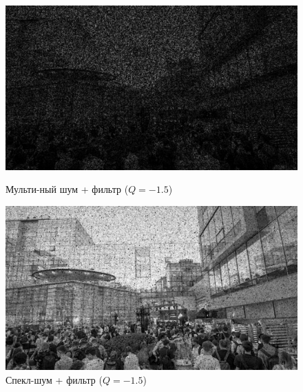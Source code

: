 \documentclass[a4paper]{article}
\begin{document}
\begin{figure}[H]
    \begin{minipage}{0.49\textwidth}
        \centering \includegraphics[width=\textwidth]{images/2_low_filters/multiplicative - contrharmonic (Q=-1.5).jpg}
        \caption{Мульти-ный шум + фильтр ($Q = -1.5$)}
    \end{minipage}\hfill
    \begin{minipage}{0.49\textwidth}
        \centering \includegraphics[width=\textwidth]{images/2_low_filters/speckle - contrharmonic (Q=-1.5).jpg}
        \caption{Спекл-шум + фильтр ($Q = -1.5$)}
    \end{minipage}
\end{figure}
\end{document}
